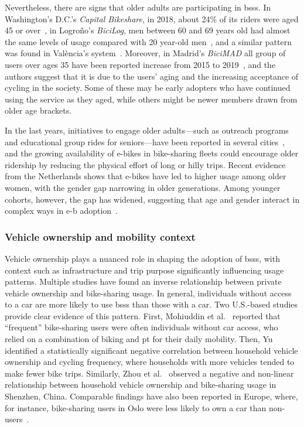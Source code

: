     Nevertheless, there are signs that older adults are participating in \acp{bss}. In Washington's D.C.'s \textit{Capital Bikeshare}, in 2018, about 24\% of its riders were aged 45 or over~\cite{Walljasper2018}, in Logroño's \textit{BiciLog}, men between 60 and 69 years old had almost the same levels of usage compared with 20 year-old men~\cite{CortezOrdonez2023}, and a similar pattern was found in València's system~\cite{PansSancho2023}. Moreover, in Madrid's \textit{BiciMAD} all group of users over ages 35 have been reported increase from 2015 to 2019~\cite{Julio2022}, and the authors suggest that it is due to the users' aging and the increasing acceptance of cycling in the society. Some of these may be early adopters who have continued using the service as they aged, while others might be newer members drawn from older age brackets. 

    In the last years, initiatives to engage older adults—such as outreach programs and educational group rides for seniors—have been reported in several cities~\cite{Ghisallo2023, BikeLNK2025}, and the growing availability of e-bikes in bike-sharing fleets could encourage older ridership by reducing the physical effort of long or hilly trips. Recent evidence from the Netherlands shows that e-bikes have led to higher usage among older women, with the gender gap narrowing in older generations. Among younger cohorts, however, the gap has widened, suggesting that age and gender interact in complex ways in \ac{e-b} adoption~\cite{Huang2024}.

    \subsubsection{Vehicle ownership and mobility context}

    Vehicle ownership plays a nuanced role in shaping the adoption of \acp{bss}, with context such as infrastructure and trip purpose significantly influencing usage patterns. Multiple studies have found an inverse relationship between private vehicle ownership and bike-sharing usage. In general, individuals without access to a car are more likely to use \acp{bss} than those with a car. Two U.S.-based studies provide clear evidence of this pattern. First, Mohiuddin et al.~\cite{Mohiuddin2024} reported that “frequent” bike-sharing users were often individuals without car access, who relied on a combination of biking and \ac{pt} for their daily mobility. Then, Yu~\cite{Yu2024} identified a statistically significant negative correlation between household vehicle ownership and cycling frequency, where households with more vehicles tended to make fewer bike trips. Similarly, Zhou et al.~\cite{Zhou2025} observed a negative and non-linear relationship between household vehicle ownership and bike-sharing usage in Shenzhen, China. Comparable findings have also been reported in Europe, where, for instance, bike-sharing users in Oslo were less likely to own a car than non-users~\cite{Mouratidis2022}.
    

